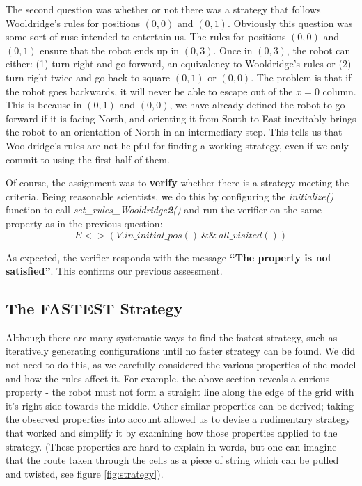 \documentclass{article}
\begin{document}
The second question was whether or not there was a strategy that follows Wooldridge's rules for positions $(0,0)$ and $(0,1)$.
Obviously this question was some sort of ruse intended to entertain us.
The rules for positions $(0,0)$ and $(0,1)$ ensure that the robot ends up in $(0,3)$.
Once in $(0,3)$, the robot can either: (1) turn right and go forward, an equivalency to Wooldridge's rules
or (2) turn right twice and go back to square $(0,1)$ or $(0,0)$.
The problem is that if the robot goes backwards, it will never be able to escape out of the $x=0$ column.
This is because in $(0,1)$ and $(0,0)$, we have already defined the robot to go forward if it is facing North, and orienting it from South to East inevitably brings the robot to an orientation of North in an intermediary step.
This tells us that Wooldridge's rules are not helpful for finding a working strategy, even if we only commit to using the first half of them.

Of course, the assignment was to \textbf{verify} whether there is a strategy meeting the criteria.
Being reasonable scientists, we do this by configuring the \textit{initialize()} function to call \textit{set\_rules\_Wooldridge\textbf{2}()} and run the verifier on the same property as in the previous question:
\[ E<>(V.in\_initial\_pos() ~ \&\& ~ all\_visited()) \]

As expected, the verifier responds with the message \textbf{``The property is not satisfied''}.
This confirms our previous assessment.

\subsection{The FASTEST Strategy}

Although there are many systematic ways to find the fastest strategy, such as iteratively generating configurations until no faster strategy can be found.
We did not need to do this, as we carefully considered the various properties of the model and how the rules affect it.
For example, the above section reveals a curious property \-- the robot must not form a straight line along the edge of the grid with it's right side towards the middle.
Other similar properties can be derived; taking the observed properties into account allowed us to devise a rudimentary strategy that worked and simplify it by examining how those properties applied to the strategy. 
(These properties are hard to explain in words, but one can imagine that the route taken through the cells as a piece of string which can be pulled and twisted, see figure \ref{fig:strategy}).
\end{document}
